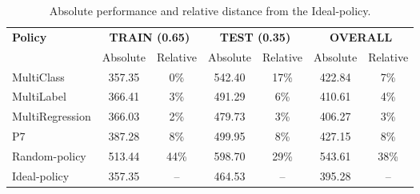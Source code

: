 \documentclass[preprint,11pt,authoryear]{elsarticle}
\newcommand{\rev}[1]{\textcolor{blue}{{#1}}}
\begin{document}
\begin{table}[ht]
\centering
\begin{tabular}{l*{6}{c}}
\multirow{2}{*}{\textbf{Policy}} & \multicolumn{2}{c}{\textbf{TRAIN (0.65)}} & \multicolumn{2}{c}{\textbf{TEST (0.35)}} & \multicolumn{2}{c}{\textbf{OVERALL}} \\
\cmidrule(lr){2-3} \cmidrule(lr){4-5} \cmidrule(lr){6-7}
 & Absolute & Relative & Absolute & Relative & Absolute & Relative \\

MultiClass & 357.35 & 0\%    & 542.40 & 17\%  & 422.84 & 7\% \\
MultiLabel  & 366.41 & 3\%   & 491.29 & 6\%   & 410.61 & 4\% \\
MultiRegression & 366.03 & 2\%   & 479.73 & 3\%   & 406.27 & 3\% \\ 
\cmidrule(lr){2-3} \cmidrule(lr){4-5} \cmidrule(lr){6-7}
P7       & 387.28 & 8\%    & 499.95 & 8\%   & 427.15 & 8\% \\
Random-policy & 513.44 & 44\%  & 598.70 & 29\%   & 543.61 & 38\% \\
Ideal-policy & 357.35 & --  & 464.53 & --    & 395.28 & -- \\
\end{tabular}
\caption{Absolute performance and relative distance from the Ideal-policy.} 
\label{tab:ml_results}
\end{table}
\end{document}
